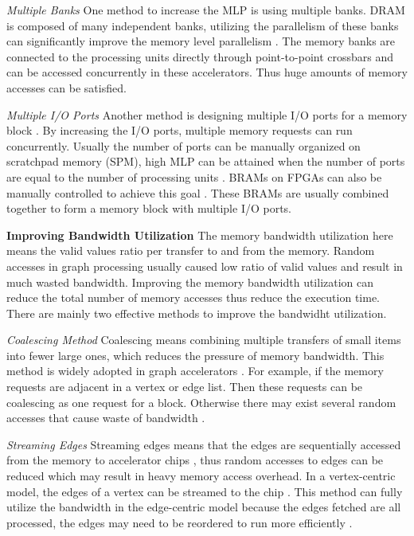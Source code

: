 \documentclass[twoside]{article}
\begin{document}
\begin{multicols}{2}
\textit{Multiple Banks} One method to increase the MLP is using multiple banks. DRAM is composed of many independent banks, utilizing the parallelism of these banks can significantly improve the memory level parallelism \cite{betkaoui2011graphlet,betkaoui2012fpgabfs,betkaoui2012ssspbrain}. The memory banks are connected to the processing units directly through point-to-point crossbars and can be accessed concurrently in these accelerators. Thus huge amounts of memory accesses can be satisfied.

\textit{Multiple I/O Ports} Another method is designing multiple I/O ports for a memory block \cite{nurvitadhi2014graphgen,zhou2016highthroughput,zhou2015fpgasssp}. By increasing the I/O ports, multiple memory requests can run concurrently. Usually the number of ports can be manually organized on scratchpad memory (SPM), high MLP can be attained when the number of ports are equal to the number of processing units \cite{ham2016graphicionado}. BRAMs on FPGAs can also be manually controlled to achieve this goal \cite{zhou2016highthroughput}. These BRAMs are usually combined together to form a memory block with multiple I/O ports.

{\bf Improving Bandwidth Utilization }\quad The memory bandwidth utilization here means the valid values ratio per transfer to and from the memory. Random accesses in graph processing usually caused low ratio of valid values and result in much wasted bandwidth. Improving the memory bandwidth utilization can reduce the total number of memory accesses thus reduce the execution time. There are mainly two effective methods to improve the bandwidht utilization.

\textit{Coalescing Method} Coalescing means combining multiple transfers of small items into fewer large ones, which reduces the pressure of memory bandwidth. This method is widely adopted in graph accelerators \cite{nurvitadhi2014graphgen,zhou2016highthroughput,zhou2015fpgasssp,zhou2015fpgapagerank,Zhang2017fpgahmcbfs}. For example, if the memory requests are adjacent in a vertex or edge list. Then these requests can be coalescing as one request for a block. Otherwise there may exist several random accesses that cause waste of bandwidth \cite{nurvitadhi2014graphgen}.

\textit{Streaming Edges} Streaming edges means that the edges are sequentially accessed from the memory to accelerator chips \cite{zhou2016highthroughput, Roy2013x-stream}, thus random accesses to edges can be reduced which may result in heavy memory access overhead. In a vertex-centric model, the edges of a vertex can be streamed to the chip \cite{ham2016graphicionado}. This method can fully utilize the bandwidth in the edge-centric model because the edges fetched are all processed, the edges may need to be reordered to run more efficiently \cite{Dai2017foregraph,zhou2016highthroughput}.


\end{multicols}
\end{document}
